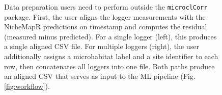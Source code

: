 \documentclass[a4paper, 11pt]{article}
\begin{document}
\begin{figure}[htbp]
\caption{\sloppy Data preparation users need to perform outside the \texttt{microclCorr} package.
  First, the user aligns the logger measurements with the Niche\-MapR predictions on
  timestamp and computes the residual (measured minus predicted).
  For a single logger (left), this produces a single aligned CSV file.
  For multiple loggers (right), the user additionally assigns a microhabitat label
  and a site identifier to each row, then concatenates all loggers into one file.
  Both paths produce an aligned CSV that serves as input to the ML pipeline
  (Fig.\,\ref{fig:workflow}).}
\label{fig:data_prep}
\end{figure}
\end{document}
